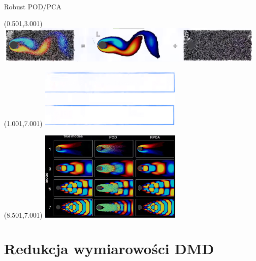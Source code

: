 \documentclass[aspectratio=169]{beamer}
\begin{document}
\begin{frame}{Robust POD/PCA}
	\begin{textblock}{13}(0.501,3.001)
		\includegraphics[width=15cm]{imgs/eigenflow.png}
	\end{textblock}
	\begin{textblock}{13}(1.001,7.001)
		\includegraphics[width=7cm]{imgs/eigenflow2.png}
	\end{textblock}
	\begin{textblock}{13}(8.501,7.001)
		\includegraphics[width=7cm]{imgs/rpca.png}
	\end{textblock}
\end{frame}



\section{Redukcja wymiarowości DMD}
\end{document}
